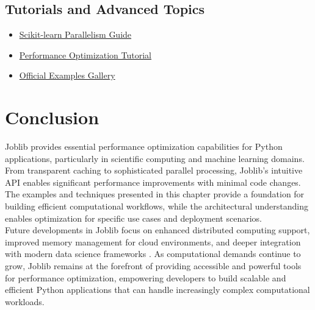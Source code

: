 \subsection{Tutorials and Advanced Topics}
\begin{itemize}
	\item \href{https://scikit-learn.org/stable/computing/parallelism.html}{Scikit-learn Parallelism Guide}
	\item \href{https://towardsdatascience.com/using-joblib-to-speed-up-your-python-pipelines-dd97440c653d}{Performance Optimization Tutorial} \cite{TowardsDS:2023}
	\item \href{https://joblib.readthedocs.io/en/latest/auto_examples/}{Official Examples Gallery}
\end{itemize}

\section{Conclusion}
\label{sec:conclusion}

Joblib provides essential performance optimization capabilities for Python applications, particularly in scientific computing and machine learning domains. From transparent caching to sophisticated parallel processing, Joblib's intuitive API enables significant performance improvements with minimal code changes. The examples and techniques presented in this chapter provide a foundation for building efficient computational workflows, while the architectural understanding enables optimization for specific use cases and deployment scenarios.\\

Future developments in Joblib focus on enhanced distributed computing support, improved memory management for cloud environments, and deeper integration with modern data science frameworks \cite{Varoquaux:2022}. As computational demands continue to grow, Joblib remains at the forefront of providing accessible and powerful tools for performance optimization, empowering developers to build scalable and efficient Python applications that can handle increasingly complex computational workloads.